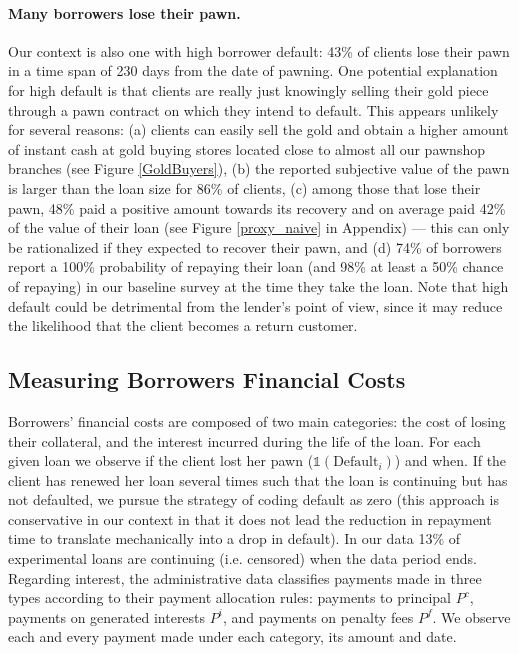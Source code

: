 \documentclass[oneside,11pt]{article}
\begin{document}
\paragraph{Many borrowers lose their pawn.} Our context is also one with high borrower default: 43\% of clients lose their pawn in a time span of 230 days from the date of pawning. One potential explanation for high default is that clients are really just knowingly selling their gold piece through a pawn contract on which they intend to default. This appears unlikely for several reasons: (a) clients can easily sell the gold and obtain a higher amount of instant cash at gold buying stores located close to almost all our pawnshop branches (see Figure \ref{GoldBuyers}), (b) the reported subjective value of the pawn is larger than the loan size for 86\% of clients, (c) among those that lose their pawn, 48\% paid a positive amount towards its recovery and on average paid 42\% of the value of their loan (see Figure \ref{proxy_naive} in Appendix) --- this can only be rationalized if they expected to recover their pawn, and (d) 74\% of borrowers report a 100\% probability of repaying their loan (and 98\% at least a 50\% chance of repaying) in our baseline survey at the time they take the loan.  Note that high default could be detrimental from the lender's point of view, since it may reduce the likelihood that the client becomes a return customer. 

    
\subsection{Measuring Borrowers Financial Costs} 
\label{costs}
    
Borrowers' financial costs are composed of two main categories: the cost of losing their collateral, and the interest incurred during the life of the loan. For each given loan we observe if the client lost her pawn ($\mathds{1}(\text{Default}_i)$) and when. If the client has renewed her loan several times such that the loan is continuing but has not defaulted, we pursue the strategy of coding default as zero (this approach is conservative in our context in that it does not lead the reduction in repayment time to translate mechanically into a drop in default). In our data 13\% of experimental loans are continuing (i.e. censored) when the data period ends. Regarding interest, the administrative data classifies payments made in three types according to their payment allocation rules: payments to principal $P^c$, payments on generated interests $P^i$, and payments on penalty fees $P^f$. We observe each and every payment made under each category, its amount and date. 
\end{document}
